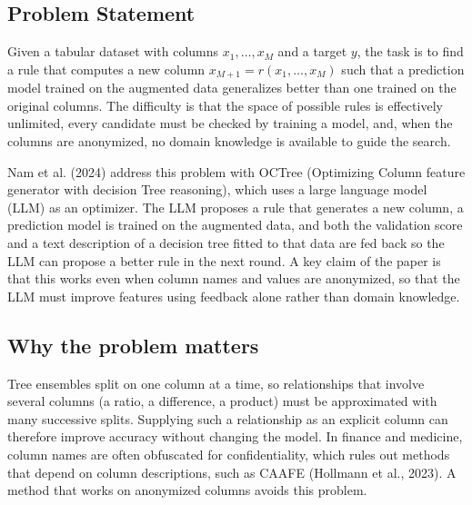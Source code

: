\documentclass[11pt]{article}
\begin{document}
\subsection{Problem Statement}
Given a tabular dataset with columns $x_1,\dots,x_M$ and a target $y$, the task is to find a rule
that computes a new column $x_{M+1}=r(x_1,\dots,x_M)$ such that a prediction model trained on the
augmented data generalizes better than one trained on the original columns. The difficulty is that
the space of possible rules is effectively unlimited, every candidate must be checked by training a
model, and, when the columns are anonymized, no domain knowledge is available to guide the search.

Nam et al. (2024) address this problem with OCTree (Optimizing Column feature generator with
decision Tree reasoning), which uses a large language model (LLM) as an optimizer. The LLM proposes
a rule that generates a new column, a prediction model is trained on the augmented data, and both
the validation score and a text description of a decision tree fitted to that data are fed back so
the LLM can propose a better rule in the next round. A key claim of the paper is that this works
even when column names and values are anonymized, so that the LLM must improve features using
feedback alone rather than domain knowledge.

\subsection{Why the problem matters}
Tree ensembles split on one column at a time, so relationships that involve several columns (a
ratio, a difference, a product) must be approximated with many successive splits. Supplying such a
relationship as an explicit column can therefore improve accuracy without changing the model.
In finance and medicine, column names are often obfuscated for confidentiality, which rules out
methods that depend on column descriptions, such as CAAFE (Hollmann et al., 2023). A method that
works on anonymized columns avoids this problem.
\end{document}
